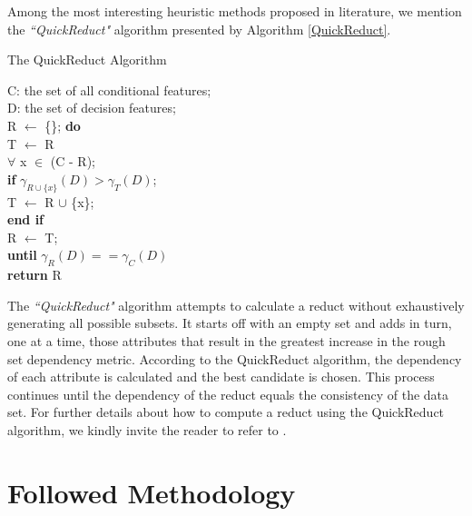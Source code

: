 \documentclass{llncs}
\begin{document}
Among the most interesting heuristic methods proposed in literature, we mention the \emph{``QuickReduct"} algorithm \cite{shen2007rough} presented by Algorithm \ref{QuickReduct}.

\begin{algorithm}[!ht]
\caption{The QuickReduct Algorithm} \label{QuickReduct}
\begin{algorithmic}[1]
\STATE C: the set of all conditional features;\\
\STATE D: the set of decision features;\\
\STATE R $\leftarrow$ \{\};
\STATE \textbf{do} \\
\STATE \hspace{0.24cm} T $\leftarrow$ R\\
 \STATE \hspace{0.24cm} $\forall$ x $\in$ (C - R);\\
 \STATE \hspace{0.28cm} \textbf{if} $\gamma_{R \cup \{x\}}(D) > \gamma_T(D)$;\\
  \STATE \hspace{0.35cm} T $\leftarrow$ R $\cup$ \{x\};\\
  \STATE \hspace{0.28cm} \textbf{end if} \\
  \STATE \hspace{0.24cm} R $\leftarrow$ T;\\
  \STATE \textbf{until} $\gamma_R(D) == \gamma_C(D)$\\
  \STATE \textbf{return} R
\end{algorithmic}
\end{algorithm}

The \emph{``QuickReduct"} algorithm  attempts to calculate a reduct without exhaustively generating all possible subsets. It starts off with an empty set and adds in turn, one at a time, those attributes that result in the greatest increase in the rough set dependency metric. According to the QuickReduct algorithm, the dependency of each attribute is calculated and the best candidate is chosen. This process continues until the dependency of the reduct equals the consistency of the data set.
For further details about how to compute a  reduct using the   QuickReduct algorithm, we kindly invite the reader to refer to  \cite{shen2007rough}.


%

\section{Followed Methodology}
\label{sec:methodology}
\end{document}
